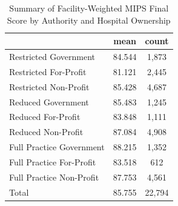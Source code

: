 \begin{table}[htbp]\centering
\def\sym#1{\ifmmode^{#1}\else\(^{#1}\)\fi}
\caption{Summary of Facility-Weighted MIPS Final Score by Authority and Hospital Ownership}
\begin{tabular}{l*{1}{cc}}
\toprule
                    &        mean&       count\\
\midrule
Restricted Government&      84.544&       1,873\\
Restricted For-Profit&      81.121&       2,445\\
Restricted Non-Profit&      85.428&       4,687\\
Reduced Government  &      85.483&       1,245\\
Reduced For-Profit  &      83.848&       1,111\\
Reduced Non-Profit  &      87.084&       4,908\\
Full Practice Government&      88.215&       1,352\\
Full Practice For-Profit&      83.518&         612\\
Full Practice Non-Profit&      87.753&       4,561\\
Total               &      85.755&      22,794\\
\bottomrule
\end{tabular}
\end{table}

